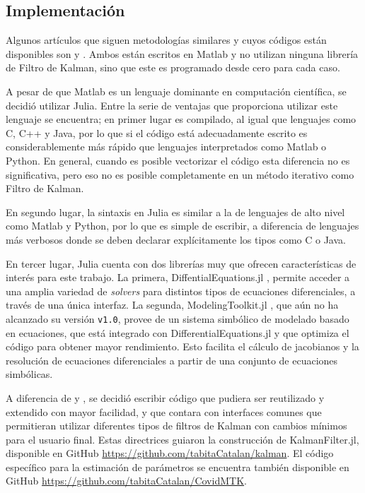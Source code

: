 



\subsection{Implementación}\label{implementacion}

Algunos artículos que siguen metodologías similares y cuyos códigos están disponibles son \cite{Hasan2020} y \cite{Sameni2020}. Ambos están escritos en Matlab y no utilizan ninguna librería de Filtro de Kalman, sino que este es programado desde cero para cada caso.

A pesar de que Matlab es un lenguaje dominante en computación científica, se decidió utilizar Julia. Entre la serie de ventajas que proporciona utilizar este lenguaje se encuentra; en primer lugar es compilado, al igual que lenguajes como C, C++ y Java, por lo que si el código está adecuadamente escrito es considerablemente más rápido que lenguajes interpretados como Matlab o Python. En general, cuando es posible vectorizar el código esta diferencia no es significativa, pero eso no es posible completamente en un método iterativo como Filtro de Kalman.

En segundo lugar, la sintaxis en Julia es similar a la de lenguajes de alto nivel como Matlab y Python, por lo que es simple de escribir, a diferencia de lenguajes más verbosos donde se deben declarar explícitamente los tipos como C o Java.

En tercer lugar, Julia cuenta con dos librerías muy que ofrecen características de interés para este trabajo. La primera, DiffentialEquations.jl \cite{Rackauckas2017}, permite acceder a una amplia variedad de \textit{solvers} para distintos tipos de ecuaciones diferenciales, a través de una única interfaz. La segunda, ModelingToolkit.jl \cite{Ma2021}, que aún no ha alcanzado su versión \texttt{v1.0}, provee de un sistema simbólico de modelado basado en ecuaciones, que está integrado con DifferentialEquations.jl y que optimiza el código para obtener mayor rendimiento. Esto facilita el cálculo de jacobianos y la resolución de ecuaciones diferenciales a partir de una conjunto de ecuaciones simbólicas.

A diferencia de \cite{Hasan2020} y \cite{Sameni2020}, se decidió escribir código que pudiera ser reutilizado y extendido con mayor facilidad, y que contara con interfaces comunes que permitieran utilizar diferentes tipos de filtros de Kalman con cambios mínimos para el usuario final. Estas directrices guiaron la construcción de KalmanFilter.jl, disponible en GitHub \url{https://github.com/tabitaCatalan/kalman}. El código específico para la estimación de parámetros se encuentra también disponible en GitHub \url{https://github.com/tabitaCatalan/CovidMTK}.

